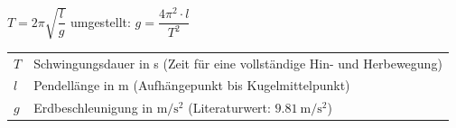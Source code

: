 \documentclass[11pt,a4paper]{scrartcl}
\begin{document}
	\vspace{0.4cm}
	
	\begin{formelbox}[title={\faIcon{square-root-alt} Ergebnis: Schwingungsdauer des Fadenpendels}]
		\begin{center}
			{\Large $T = 2\pi\sqrt{\dfrac{l}{g}}$}
			\hspace{2cm}
			umgestellt: 
			\hspace{2cm}
			{\Large $g = \dfrac{4\pi^2 \cdot l}{T^2}$}
		\end{center}
		
		\vspace{0.2cm}
		
		\begin{tabular}{ll}
			$T$ & Schwingungsdauer in s (Zeit für eine vollständige Hin- und Herbewegung) \\
			$l$ & Pendellänge in m (Aufhängepunkt bis Kugelmittelpunkt) \\
			$g$ & Erdbeschleunigung in $\si{\metre\per\second\squared}$ (Literaturwert: $\SI{9,81}{\metre\per\second\squared}$)
		\end{tabular}
	\end{formelbox}
	
\end{document}
